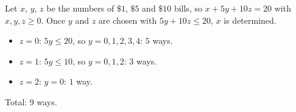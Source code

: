 Let $x$, $y$, $z$ be the numbers of $\$1$, $\$5$ and $\$10$ bills, so $x+5y+10z=20$ with $x,y,z\ge0$. Once $y$ and $z$ are chosen with $5y+10z\le20$, $x$ is determined.
\begin{itemize}
\item $z=0$: $5y\le20$, so $y=0,1,2,3,4$: $5$ ways.
\item $z=1$: $5y\le10$, so $y=0,1,2$: $3$ ways.
\item $z=2$: $y=0$: $1$ way.
\end{itemize}
Total: $\boxed{9}$ ways.
